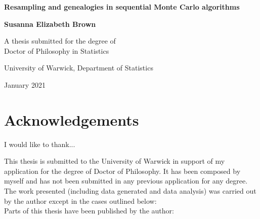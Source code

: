 \documentclass[oneside]{scrbook} %
\theoremstyle{definition}
\newcommand{\1}[1]{\mathbbm{1}_{#1}} %
\begin{document}
\begin{titlepage}
\centering
\vspace*{5cm}
\begin{LARGE}\bfseries
Resampling and genealogies in sequential Monte Carlo algorithms\par \end{LARGE} 
\vspace{1.5cm} 
\begin{Large}\bfseries
Susanna Elizabeth Brown\par
\end{Large}
\vspace{3cm}
\begin{large}
A thesis submitted for the degree of\\Doctor of Philosophy in Statistics \par
\vspace{1.5cm}
University of Warwick, Department of Statistics \par
\vspace{1.5cm}
January 2021 %
\end{large}
\end{titlepage}


\frontmatter

\tableofcontents
\listoffigures
\listoftables

\chapter{Acknowledgements}
I would like to thank... %
\vspace*{3cm}


This thesis is submitted to the University of Warwick in support of my application for the degree of Doctor of Philosophy. It has been composed by myself and has not been submitted in any previous application for any degree. %
\\[5pt]
The work presented (including data generated and data analysis) was carried out by the author except in the cases outlined below:
\\[5pt]
Parts of this thesis have been published by the author:
\end{document}
